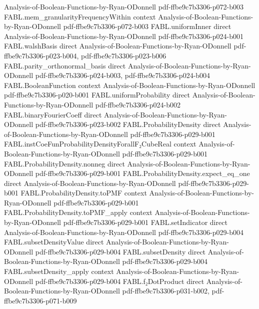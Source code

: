 \begin{theorem}
  {Analysis-of-Boolean-Functions-by-Ryan-ODonnell}
  {pdf-ffbe9c7b3306-p072-b003}
\proofstep
  {FABL.mem_granularityFrequencyWithin}
  {context}
  {Analysis-of-Boolean-Functions-by-Ryan-ODonnell}
  {pdf-ffbe9c7b3306-p072-b003}
\proofstep
  {FABL.uniformInner}
  {direct}
  {Analysis-of-Boolean-Functions-by-Ryan-ODonnell}
  {pdf-ffbe9c7b3306-p024-b001}
\proofstep
  {FABL.walshBasis}
  {direct}
  {Analysis-of-Boolean-Functions-by-Ryan-ODonnell}
  {pdf-ffbe9c7b3306-p023-b004,
    pdf-ffbe9c7b3306-p023-b006}
\proofstep
  {FABL.parity_orthonormal_basis}
  {direct}
  {Analysis-of-Boolean-Functions-by-Ryan-ODonnell}
  {pdf-ffbe9c7b3306-p024-b003,
    pdf-ffbe9c7b3306-p024-b004}
\proofstep
  {FABL.BooleanFunction}
  {context}
  {Analysis-of-Boolean-Functions-by-Ryan-ODonnell}
  {pdf-ffbe9c7b3306-p020-b001}
\proofstep
  {FABL.uniformProbability}
  {direct}
  {Analysis-of-Boolean-Functions-by-Ryan-ODonnell}
  {pdf-ffbe9c7b3306-p024-b002}
\proofstep
  {FABL.binaryFourierCoeff}
  {direct}
  {Analysis-of-Boolean-Functions-by-Ryan-ODonnell}
  {pdf-ffbe9c7b3306-p023-b002}
\proofstep
  {FABL.ProbabilityDensity}
  {direct}
  {Analysis-of-Boolean-Functions-by-Ryan-ODonnell}
  {pdf-ffbe9c7b3306-p029-b001}
\proofstep
  {FABL.instCoeFunProbabilityDensityForallF₂CubeReal}
  {context}
  {Analysis-of-Boolean-Functions-by-Ryan-ODonnell}
  {pdf-ffbe9c7b3306-p029-b001}
\proofstep
  {FABL.ProbabilityDensity.nonneg}
  {direct}
  {Analysis-of-Boolean-Functions-by-Ryan-ODonnell}
  {pdf-ffbe9c7b3306-p029-b001}
\proofstep
  {FABL.ProbabilityDensity.expect_eq_one}
  {direct}
  {Analysis-of-Boolean-Functions-by-Ryan-ODonnell}
  {pdf-ffbe9c7b3306-p029-b001}
\proofstep
  {FABL.ProbabilityDensity.toPMF}
  {context}
  {Analysis-of-Boolean-Functions-by-Ryan-ODonnell}
  {pdf-ffbe9c7b3306-p029-b001}
\proofstep
  {FABL.ProbabilityDensity.toPMF_apply}
  {context}
  {Analysis-of-Boolean-Functions-by-Ryan-ODonnell}
  {pdf-ffbe9c7b3306-p029-b001}
\proofstep
  {FABL.setIndicator}
  {direct}
  {Analysis-of-Boolean-Functions-by-Ryan-ODonnell}
  {pdf-ffbe9c7b3306-p029-b004}
\proofstep
  {FABL.subsetDensityValue}
  {direct}
  {Analysis-of-Boolean-Functions-by-Ryan-ODonnell}
  {pdf-ffbe9c7b3306-p029-b004}
\proofstep
  {FABL.subsetDensity}
  {direct}
  {Analysis-of-Boolean-Functions-by-Ryan-ODonnell}
  {pdf-ffbe9c7b3306-p029-b004}
\proofstep
  {FABL.subsetDensity_apply}
  {context}
  {Analysis-of-Boolean-Functions-by-Ryan-ODonnell}
  {pdf-ffbe9c7b3306-p029-b004}
\proofstep
  {FABL.f₂DotProduct}
  {direct}
  {Analysis-of-Boolean-Functions-by-Ryan-ODonnell}
  {pdf-ffbe9c7b3306-p031-b002,
    pdf-ffbe9c7b3306-p071-b009}

\end{theorem}
